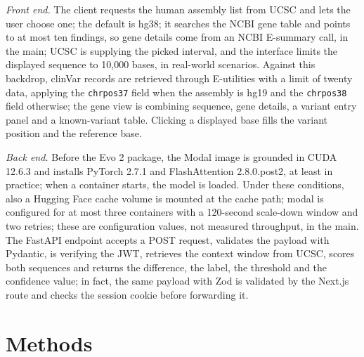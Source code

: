 \documentclass[10pt,journal]{IEEEtran}
\begin{document}
\textit{Front end.} The client requests the human assembly list from UCSC and lets the user choose one; the default is hg38; it searches the NCBI gene table and points to at most ten findings, so gene details come from an NCBI E-summary call, in the main; UCSC is supplying the picked interval, and the interface limits the displayed sequence to 10{,}000 bases, in real-world scenarios. Against this backdrop, clinVar records are retrieved through E-utilities with a limit of twenty data, applying the \texttt{chrpos37} field when the assembly is hg19 and the \texttt{chrpos38} field otherwise; the gene view is combining sequence, gene details, a variant entry panel and a known-variant table. Clicking a displayed base fills the variant position and the reference base.

\textit{Back end.} Before the Evo 2 package, the Modal image is grounded in CUDA 12.6.3 and installs PyTorch 2.7.1 and FlashAttention 2.8.0.post2, at least in practice; when a container starts, the model is loaded. Under these conditions, also a Hugging Face cache volume is mounted at the cache path; modal is configured for at most three containers with a 120-second scale-down window and two retries; these are configuration values, not measured throughput, in the main. The FastAPI endpoint accepts a POST request, validates the payload with Pydantic, is verifying the JWT, retrieves the context window from UCSC, scores both sequences and returns the difference, the label, the threshold and the confidence value; in fact, the same payload with Zod is validated by the Next.js route and checks the session cookie before forwarding it.

\section{Methods}
\label{sec:methods}
\end{document}
